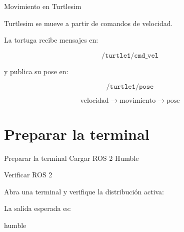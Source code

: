 \documentclass[aspectratio=169]{beamer}
\begin{document}
\begin{frame}{Movimiento en Turtlesim}

Turtlesim se mueve a partir de comandos de velocidad.

La tortuga recibe mensajes en:

\[
\texttt{/turtle1/cmd\_vel}
\]

y publica su pose en:

\[
\texttt{/turtle1/pose}
\]

\vspace{0.3cm}

\[
\text{velocidad}
\rightarrow
\text{movimiento}
\rightarrow
\text{pose}
\]

\vspace{0.3cm}


\end{frame}

\section{Preparar la terminal}

\SectionSlide
{Preparar la terminal}
{Cargar ROS 2 Humble}

\begin{frame}[fragile]{Verificar ROS 2}

Abra una terminal y verifique la distribución activa:


La salida esperada es:

\begin{bashcode}
    humble
\end{bashcode}

\vspace{0.3cm}


\end{frame}
\end{document}

